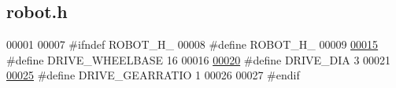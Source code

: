 \hypertarget{robot_8h_source}{}\subsection{robot.\+h}
\label{robot_8h_source}

\begin{DoxyCode}
00001 
00007 \textcolor{preprocessor}{#ifndef ROBOT\_H\_}
00008 \textcolor{preprocessor}{#define ROBOT\_H\_}
00009 
\hypertarget{robot_8h_source.tex_l00015}{}\hyperlink{robot_8h_a61fe90734b16253ea19fc295e0ec71dc}{00015} \textcolor{preprocessor}{#define DRIVE\_WHEELBASE 16}
00016 
\hypertarget{robot_8h_source.tex_l00020}{}\hyperlink{robot_8h_a756d6f470dc64b6c3c004b75760d60d0}{00020} \textcolor{preprocessor}{#define DRIVE\_DIA 3}
00021 
\hypertarget{robot_8h_source.tex_l00025}{}\hyperlink{robot_8h_ac82b3d02a4f4ff550895e0cb11b96219}{00025} \textcolor{preprocessor}{#define DRIVE\_GEARRATIO 1}
00026 
00027 \textcolor{preprocessor}{#endif}
\end{DoxyCode}
